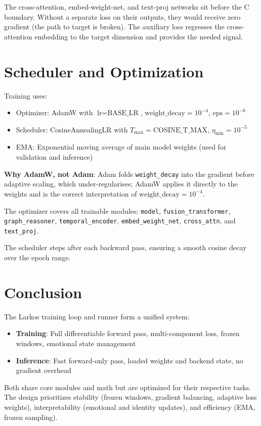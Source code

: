 \documentclass[12pt]{article}
\begin{document}
The cross-attention, embed-weight-net, and text-proj networks sit before
the C boundary. Without a separate loss on their outputs, they would
receive zero gradient (the path to target is broken). The auxiliary loss
regresses the cross-attention embedding to the target dimension and
provides the needed signal.

\section{Scheduler and Optimization}

Training uses:

\begin{itemize}
  \item Optimizer: AdamW with $\text{lr} = \text{BASE\_LR}$,
    $\text{weight\_decay} = 10^{-4}$, $\text{eps} = 10^{-6}$
  \item Scheduler: CosineAnnealingLR with
    $T_{\max} = \text{COSINE\_T\_MAX}$,
    $\eta_{\min} = 10^{-5}$
  \item EMA: Exponential moving average of main model weights (used for
    validation and inference)
\end{itemize}

\textbf{Why AdamW, not Adam}: Adam folds \texttt{weight\_decay} into
the gradient before adaptive scaling, which under-regularises;
AdamW applies it directly to the weights and is the correct
interpretation of $\text{weight\_decay} = 10^{-4}$.

The optimizer covers all trainable modules:
\texttt{model}, \texttt{fusion\_transformer}, \texttt{graph\_reasoner},
\texttt{temporal\_encoder}, \texttt{embed\_weight\_net},
\texttt{cross\_attn}, and \texttt{text\_proj}.

The scheduler steps after each backward pass, ensuring a smooth cosine
decay over the epoch range.

\section{Conclusion}

The Larkos training loop and runner form a unified system:

\begin{itemize}
  \item \textbf{Training}: Full differentiable forward pass,
    multi-component loss, frozen windows, emotional state management
  \item \textbf{Inference}: Fast forward-only pass, loaded weights and
    backend state, no gradient overhead
\end{itemize}

Both share core modules and math but are optimized for their respective
tasks. The design prioritizes stability (frozen windows, gradient
balancing, adaptive loss weights), interpretability (emotional and
identity updates), and efficiency (EMA, frozen sampling).
\end{document}
